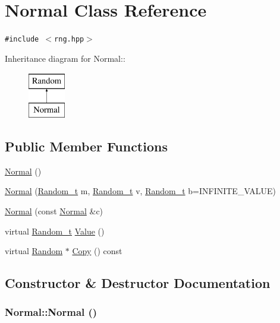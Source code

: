 \hypertarget{classNormal}{
\section{Normal Class Reference}
\label{classNormal}
}
{\tt \#include $<$rng.hpp$>$}

Inheritance diagram for Normal::\begin{figure}[H]
\begin{center}
\leavevmode
\includegraphics[height=2cm]{classNormal}
\end{center}
\end{figure}
\subsection*{Public Member Functions}
\begin{CompactItemize}
\item 
\hyperlink{classNormal_f62e51ec40dc2eedc3b9ca49ebdc7197}{Normal} ()
\item 
\hyperlink{classNormal_d217f8c08ba608aa4409f60bb7a8bb9d}{Normal} (\hyperlink{rng_8hpp_ad41e7f5d86b1109b6a6a032c86cdd3f}{Random\_\-t} m, \hyperlink{rng_8hpp_ad41e7f5d86b1109b6a6a032c86cdd3f}{Random\_\-t} v, \hyperlink{rng_8hpp_ad41e7f5d86b1109b6a6a032c86cdd3f}{Random\_\-t} b=INFINITE\_\-VALUE)
\item 
\hyperlink{classNormal_f79886344f9b8e79820d78aeb68e3e00}{Normal} (const \hyperlink{classNormal}{Normal} \&c)
\item 
virtual \hyperlink{rng_8hpp_ad41e7f5d86b1109b6a6a032c86cdd3f}{Random\_\-t} \hyperlink{classNormal_f9f5b8c8ba6dff8beb660a70935dd99e}{Value} ()
\item 
virtual \hyperlink{classRandom}{Random} $\ast$ \hyperlink{classNormal_e59f996a159efc4b26c6e373f672b050}{Copy} () const 
\end{CompactItemize}


\subsection{Constructor \& Destructor Documentation}
\hypertarget{classNormal_f62e51ec40dc2eedc3b9ca49ebdc7197}{
\subsubsection[{Normal}]{\setlength{\rightskip}{0pt plus 5cm}Normal::Normal ()}}
\label{classNormal_f62e51ec40dc2eedc3b9ca49ebdc7197}


